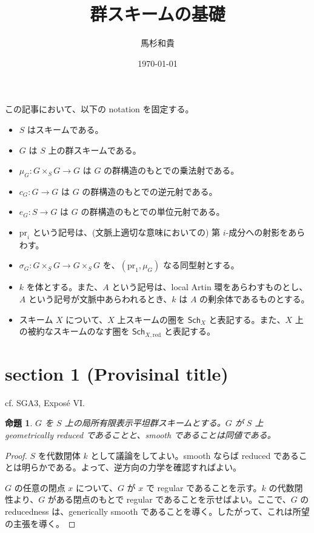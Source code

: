\documentclass{jsarticle}
\title{群スキームの基礎}
\author{馬杉和貴}
\date{\today}
\newcommand{\pr}[1]{\mathrm{pr}_{#1}}
\newcommand{\Sch}{\mathsf{Sch}}
\newtheorem{prop}[thm]{命題}
\begin{document}
\maketitle

この記事において、以下の notation を固定する。

\begin{itemize}
  \item $S$ はスキームである。
  \item $G$ は $S$ 上の群スキームである。
  \item $\mu_G \colon G \times_S G \to G$ は $G$ の群構造のもとでの乗法射である。
  \item $c_G \colon G \to G$ は $G$ の群構造のもとでの逆元射である。
  \item $e_G \colon S \to G$ は $G$ の群構造のもとでの単位元射である。
  \item $\pr{i}$ という記号は、(文脈上適切な意味においての) 第 $i$-成分への射影をあらわす。
  \item $\sigma_G \colon G \times_S G \to G \times_S G$ を、$(\pr{1}, \mu_G)$ なる同型射とする。
  \item $k$ を体とする。また、$A$ という記号は、local Artin 環をあらわすものとし、$A$ という記号が文脈中あらわれるとき、$k$ は $A$ の剰余体であるものとする。
  \item スキーム $X$ について、$X$ 上スキームの圏を $\Sch_X$ と表記する。また、$X$ 上の被約なスキームのなす圏を $\Sch_{X, \mathrm{red}}$ と表記する。
\end{itemize}

\section{section 1 (Provisinal title)}

cf. SGA3, Expos\'{e} VI.

\begin{prop}
  $G$ を $S$ 上の局所有限表示平坦群スキームとする。$G$ が $S$ 上 geometrically reduced であることと、smooth であることは同値である。
\end{prop}
\begin{proof}
  $S$ を代数閉体 $k$ として議論をしてよい。smooth ならば reduced であることは明らかである。よって、逆方向の力学を確認すればよい。

  $G$ の任意の閉点 $x$ について、$G$ が $x$ で regular であることを示す。$k$ の代数閉性より、$G$ がある閉点のもとで regular であることを示せばよい。ここで、$G$ の reducedness は、generically smooth であることを導く。したがって、これは所望の主張を導く。
\end{proof}
\end{document}
